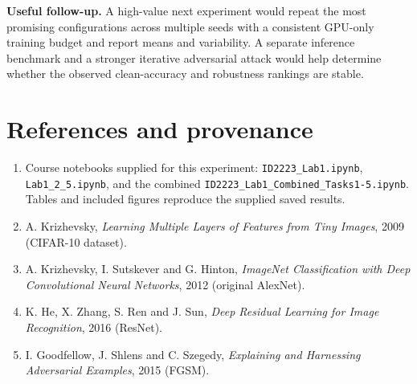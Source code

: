 \documentclass[11pt,a4paper]{article}
\begin{document}
\textbf{Useful follow-up.} A high-value next experiment would repeat the most promising configurations across multiple seeds with a consistent GPU-only training budget and report means and variability. A separate inference benchmark and a stronger iterative adversarial attack would help determine whether the observed clean-accuracy and robustness rankings are stable.

\section*{References and provenance}
\begin{enumerate}[leftmargin=*]
\item Course notebooks supplied for this experiment: \texttt{ID2223\_Lab1.ipynb}, \texttt{Lab1\_2\_5.ipynb}, and the combined \texttt{ID2223\_Lab1\_Combined\_Tasks1-5.ipynb}. Tables and included figures reproduce the supplied saved results.
\item A. Krizhevsky, \emph{Learning Multiple Layers of Features from Tiny Images}, 2009 (CIFAR-10 dataset).
\item A. Krizhevsky, I. Sutskever and G. Hinton, \emph{ImageNet Classification with Deep Convolutional Neural Networks}, 2012 (original AlexNet).
\item K. He, X. Zhang, S. Ren and J. Sun, \emph{Deep Residual Learning for Image Recognition}, 2016 (ResNet).
\item I. Goodfellow, J. Shlens and C. Szegedy, \emph{Explaining and Harnessing Adversarial Examples}, 2015 (FGSM).
\end{enumerate}
\end{document}
